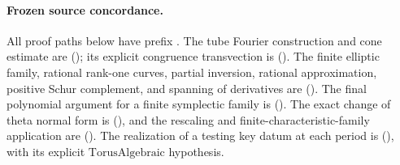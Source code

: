 \paragraph{Frozen source concordance.}
All proof paths below have prefix
.
The tube Fourier construction and cone estimate are
();
its explicit congruence transvection is
().
The finite elliptic family, rational rank-one curves, partial
inversion, rational approximation, positive Schur complement,
and spanning of derivatives are
().
The final polynomial argument for a finite symplectic family is
().
The exact change of theta normal form is
(),
and the rescaling and finite-characteristic-family application
are 
().
The realization of a testing key datum at each period is
(),
with its explicit \(\mathrm{TorusAlgebraic}\) hypothesis.
